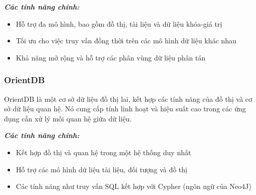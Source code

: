 \par \textbf{\textit{Các tính năng chính:}} \begin{itemize} \item Hỗ trợ đa mô hình, bao gồm đồ thị, tài liệu và dữ liệu khóa-giá trị \item Tối ưu cho việc truy vấn đồng thời trên các mô hình dữ liệu khác nhau \item Khả năng mở rộng và hỗ trợ các phân vùng dữ liệu phân tán \end{itemize}

\subsubsection{OrientDB}
OrientDB là một cơ sở dữ liệu đồ thị lai, kết hợp các tính năng của đồ thị và cơ sở dữ liệu quan hệ. Nó cung cấp tính linh hoạt và hiệu suất cao trong các ứng dụng cần xử lý mối quan hệ giữa dữ liệu.

\par \textbf{\textit{Các tính năng chính:}} \begin{itemize} \item Kết hợp đồ thị và quan hệ trong một hệ thống duy nhất \item Hỗ trợ các mô hình dữ liệu tài liệu, đối tượng và đồ thị \item Các tính năng như truy vấn SQL kết hợp với Cypher (ngôn ngữ của Neo4J) \end{itemize}


